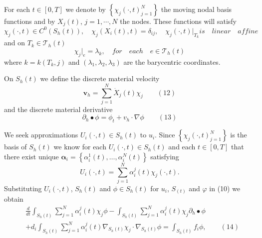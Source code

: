\documentclass[notheorems,serif]{beamer}
\begin{document}
\begin{frame}
For each $t\in[0, T]$ we denote by $\left\{\chi_j(\cdot, t)_{j=1}^N\right\}$ the moving nodal basis functions and by $X_j(t)$, $j=1,\cdots,N$ the nodes. These functions will satisfy
\begin{equation*}
\chi_j(\cdot, t)\in C^0(S_h(t)),\quad\chi_j(X_i(t), t)=\delta_{ij},\quad\chi_j(\cdot, t)\bigg|_{T_k} is\quad linear\quad affine
\end{equation*}
and on $T_k\in\mathcal{T}_h(t)$
\begin{equation*}
\chi_j\bigg|_e=\lambda_k,\quad for\quad each\quad e\in\mathcal{T}_h(t)
\end{equation*}
where $k=k(T_k, j)$ and $(\lambda_1, \lambda_2, \lambda_3)$ are the barycentric coordinates.

On $S_h(t)$ we define the discrete material velocity
\begin{equation*}
\boldsymbol{v}_h=\sum\limits_{j=1}^N\dot{X}_j(t)\chi_j\qquad(12)
\end{equation*}
and the discrete material derivative
\begin{equation*}
\partial_h\bullet\phi=\phi_t+v_h\cdot\nabla\phi\qquad(13)
\end{equation*}
\end{frame}

\begin{frame}
We seek approximations $U_i(\cdot, t)\in S_h(t)$ to $u_i$. Since $\left\{\chi_j(\cdot, t)_{j=1}^N\right\}$ is the basis of $S_h(t)$ we know for each $U_i(\cdot, t)\in S_h(t)$ and each $t\in[0, T]$ that there exist unique $\boldsymbol{\alpha}_i=\left\{\alpha_i^1(t),\dots,\alpha_i^N(t)\right\}$ satisfying
\begin{equation*}
U_i(\cdot, t)=\sum\limits_{j=1}^N\alpha_i^j(t)\chi_j(\cdot, t).
\end{equation*}
Substituting $U_i(\cdot, t)$, $S_h(t)$ and $\phi\in S_h(t)$ for $u_i$, $S_(t)$ and $\varphi$ in (10) we obtain
\begin{equation*}
\begin{aligned}
&\frac{d}{dt}\int_{S_h(t)}\sum\limits_{j=1}^N\alpha_i^j(t)\chi_j\phi-\int_{S_h(t)}\sum\limits_{j=1}^N\alpha_i^j(t)\chi_j\partial_h\bullet\phi\\
&+d_i\int_{S_h(t)}\sum\limits_{j=1}^N\alpha_i^j(t)\nabla_{S_h(t)}\chi_j\cdot\nabla_{S_h(t)}\phi=\int_{S_h(t)}f_i\phi,\qquad(14)
\end{aligned}
\end{equation*}
\end{frame}
\end{document}

